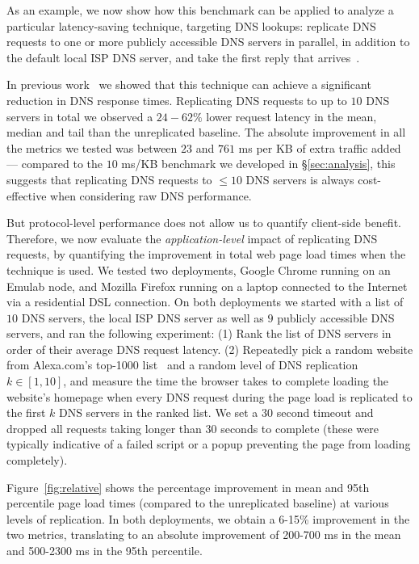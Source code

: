 \documentclass{sigcomm-alternate}
\begin{document}
As an example, we now show how this benchmark can be applied to analyze a particular latency-saving technique, targeting DNS lookups: replicate DNS requests to one or more publicly accessible DNS servers in parallel, in addition to the default local ISP DNS server, and take the first reply that arrives~\cite{Vulimiri2012, Vulimiri2013}.

In previous work~\cite{Vulimiri2012,Vulimiri2013} we showed that this technique can achieve a significant reduction in DNS response times.  Replicating DNS requests to up to $10$ DNS servers in total we observed a $24 - 62\%$ lower request latency in the mean, median and tail than the unreplicated baseline.  The absolute improvement in all the metrics we tested was between $23$ and $761$ ms per KB of extra traffic added --- compared to the $10$ ms/KB benchmark we developed in \S\ref{sec:analysis}, this suggests that replicating DNS requests to $\le 10$ DNS servers is always cost-effective when considering raw DNS performance.

But protocol-level performance does not allow us to quantify client-side benefit.  Therefore, we now evaluate the \emph{appli\-cation-level} impact of replicating DNS requests, by quantifying the improvement in total web page load times when the technique is used.  We tested two deployments, Google Chrome running on an Emulab node, and Mozilla Firefox running on a laptop connected to the Internet via a residential DSL connection.  On both deployments we started with a list of $10$ DNS servers, the local ISP DNS server as well as $9$ publicly accessible DNS servers, and ran the following experiment: (1) Rank the list of DNS servers in order of their average DNS request latency.   (2)  Repeatedly pick a random website from Alexa.com's top-1000 list~\cite{alexa} and a random level of DNS replication $k \in [1, 10]$, and measure the time the browser takes to complete loading the website's homepage when every DNS request during the page load is replicated to the first $k$ DNS servers in the ranked list.  We set a $30$ second timeout and dropped all requests taking longer than $30$ seconds to complete (these were typically indicative of a failed script or a popup preventing the page from loading completely).

Figure~\ref{fig:relative} shows the percentage improvement in mean and 95th percentile page load times (compared to the unreplicated baseline) at various levels of replication.  In both deployments, we obtain a 6-15\% improvement in the two metrics, translating to an absolute improvement of 200-700 ms in the mean and 500-2300 ms in the 95th percentile.
\end{document}
